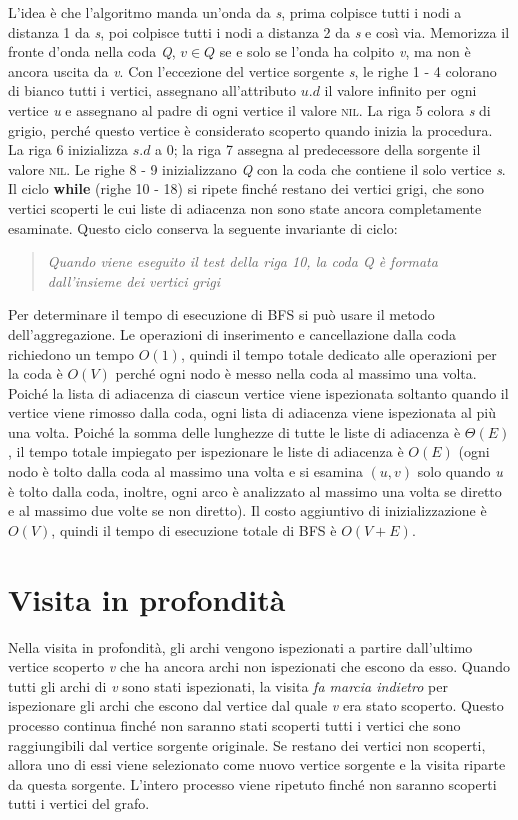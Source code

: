 \documentclass[10pt, a4paper]{report}
\begin{document}
L'idea è che l'algoritmo manda un'onda da \textit{s}, prima colpisce tutti i nodi a distanza 1 da \textit{s}, poi colpisce tutti i nodi a distanza 2 da \textit{s} e così via. Memorizza il fronte d'onda nella coda \textit{Q}, $v \in Q$ se e solo se l'onda ha colpito \textit{v}, ma non è ancora uscita da \textit{v}. Con l'eccezione del vertice sorgente \textit{s}, le righe 1 - 4 colorano di bianco tutti i vertici, assegnano all'attributo $u.d$ il valore infinito per ogni vertice \textit{u} e assegnano al padre di ogni vertice il valore \textsc{nil}. La riga 5 colora \textit{s} di grigio, perché questo vertice è considerato scoperto quando inizia la procedura. La riga 6 inizializza $s.d$ a 0; la riga 7 assegna al predecessore della sorgente il valore \textsc{nil}. Le righe 8 - 9 inizializzano \textit{Q} con la coda che contiene il solo vertice \textit{s}. Il ciclo \textbf{while} (righe 10 - 18) si ripete finché restano dei vertici grigi, che sono vertici scoperti le cui liste di adiacenza non sono state ancora completamente esaminate. Questo ciclo conserva la seguente invariante di ciclo:
\begin{quote}
\textit{Quando viene eseguito il test della riga 10, la coda \textit{Q} è formata dall'insieme dei vertici grigi}
\end{quote}
Per determinare il tempo di esecuzione di \textsc{BFS} si può usare il metodo dell'aggregazione. Le operazioni di inserimento e cancellazione dalla coda richiedono un tempo $O(1)$, quindi il tempo totale dedicato alle operazioni per la coda è $O(V)$ perché ogni nodo è messo nella coda al massimo una volta. Poiché la lista di adiacenza di ciascun vertice viene ispezionata soltanto quando il vertice viene rimosso dalla coda, ogni lista di adiacenza viene ispezionata al più una volta. Poiché la somma delle lunghezze di tutte le liste di adiacenza è $\Theta(E)$, il tempo totale impiegato per ispezionare le liste di adiacenza è $O(E)$ (ogni nodo è tolto dalla coda al massimo una volta e si esamina $(u,v)$ solo quando \textit{u} è tolto dalla coda, inoltre, ogni arco è analizzato al massimo una volta se diretto e al massimo due volte se non diretto). Il costo aggiuntivo di inizializzazione è $O(V)$, quindi il tempo di esecuzione totale di \textsc{BFS} è $O(V + E)$.
\section{Visita in profondità}
Nella visita in profondità, gli archi vengono ispezionati a partire dall'ultimo vertice scoperto \textit{v} che ha ancora archi non ispezionati che escono da esso. Quando tutti gli archi di \textit{v} sono stati ispezionati, la visita \textsl{fa marcia indietro} per ispezionare gli archi che escono dal vertice dal quale \textit{v} era stato scoperto. Questo processo continua finché non saranno stati scoperti tutti i vertici che sono raggiungibili dal vertice sorgente originale. Se restano dei vertici non scoperti, allora uno di essi viene selezionato come nuovo vertice sorgente e la visita riparte da questa sorgente. L'intero processo viene ripetuto finché non saranno scoperti tutti i vertici del grafo.
\end{document}
